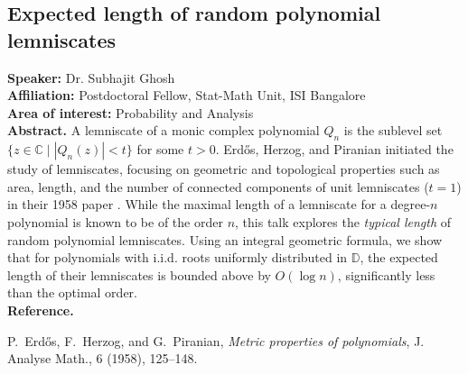 \subsection*{Expected length of random polynomial lemniscates} %
\noindent
\textbf{Speaker:} Dr. Subhajit Ghosh \\ %
\textbf{Affiliation:} Postdoctoral Fellow, Stat-Math Unit, ISI Bangalore \\ %
\textbf{Area of interest:} Probability and Analysis\\

\noindent\textbf{Abstract.}  A lemniscate of a monic complex polynomial \( Q_n \) is the sublevel set \( \{z \in \mathbb{C} \mid |Q_n(z)| < t\} \) for some \( t > 0 \). Erdős, Herzog, and Piranian initiated the study of lemniscates, focusing on geometric and topological properties such as area, length, and the number of connected components of unit lemniscates (\( t = 1 \)) in their 1958 paper \cite{metricEHP}. While the maximal length of a lemniscate for a degree-\( n \) polynomial is known to be of the order \( n \), this talk explores the \emph{typical length} of random polynomial lemniscates. Using an integral geometric formula, we show that for polynomials with i.i.d. roots uniformly distributed in \( \mathbb{D} \), the expected length of their lemniscates is bounded above by \( O(\log n) \), significantly less than the optimal order.
\\

\noindent \textbf{Reference.}
\begin{enumerate}[label={[}\arabic*{]}\setlength{\labelsep}{0.5em}, left=0pt, itemsep=0pt]
    \item P.~Erd\H{o}s, F.~Herzog, and G.~Piranian, \textit{Metric properties of polynomials}, J. Analyse Math., 6 (1958), 125--148.
\end{enumerate}
